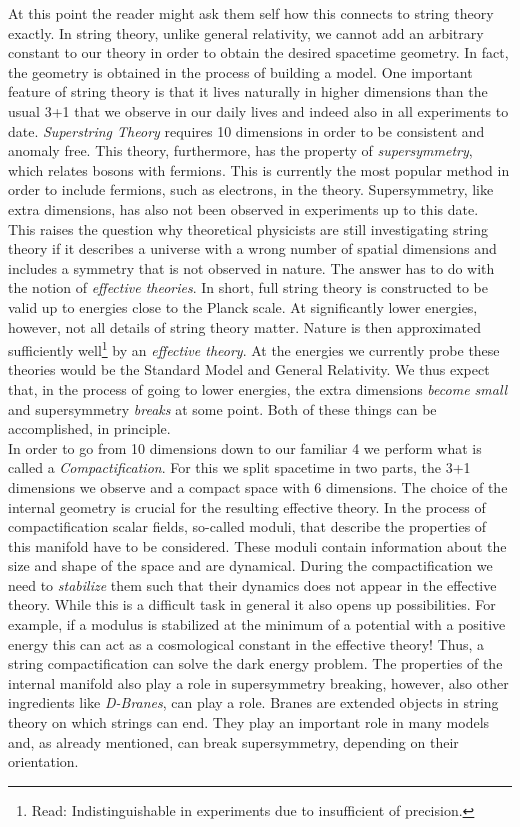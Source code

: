 \documentclass[a4paper,12pt,twoside,openright]{report}
\begin{document}
At this point the reader might ask them self how this connects to string theory exactly. In string theory, unlike general relativity, we cannot add an arbitrary constant to our theory in order to obtain the desired spacetime geometry. In fact, the geometry is obtained in the process of building a model. One important feature of string theory is that it lives naturally in higher dimensions than the usual 3+1 that we observe in our daily lives and indeed also in all experiments to date. \emph{Superstring Theory} requires 10 dimensions in order to be consistent and anomaly free. This theory, furthermore, has the property of \emph{supersymmetry}, which relates bosons with fermions. This is currently the most popular method in order to include fermions, such as electrons, in the theory. Supersymmetry, like extra dimensions, has also not been observed in experiments up to this date.\\
This raises the question why theoretical physicists are still investigating string theory if it describes a universe with a wrong number of spatial dimensions and includes a symmetry that is not observed in nature. The answer has to do with the notion of \emph{effective theories}. In short, full string theory is constructed to be valid up to energies close to the Planck scale. At significantly lower energies, however, not all details of string theory matter. Nature is then approximated sufficiently well\footnote{Read: Indistinguishable in experiments due to insufficient of precision.} by an \emph{effective theory}. At the energies we currently probe these theories would be the Standard Model and General Relativity. We thus expect that, in the process of going to lower energies, the extra dimensions \emph{become small} and supersymmetry \emph{breaks} at some point. Both of these things can be accomplished, in principle.\\
In order to go from 10 dimensions down to our familiar 4 we perform what is called a \emph{Compactification}. For this we split spacetime in two parts, the 3+1 dimensions we observe and a compact space with 6 dimensions. The choice of the internal geometry is crucial for the resulting effective theory. In the process of compactification scalar fields, so-called moduli, that describe the properties of this manifold have to be considered. These moduli contain information about the size and shape of the space and are dynamical. During the compactification we need to \emph{stabilize} them such that their dynamics does not appear in the effective theory. While this is a difficult task in general it also opens up possibilities. For example, if a modulus is stabilized at the minimum of a potential with a positive energy this can act as a cosmological constant in the effective theory! Thus, a string compactification can solve the dark energy problem. The properties of the internal manifold also play a role in supersymmetry breaking, however, also other ingredients like \emph{D-Branes}, can play a role. Branes are extended objects in string theory on which strings can end. They play an important role in many models and, as already mentioned, can break supersymmetry, depending on their orientation.\\
\end{document}
